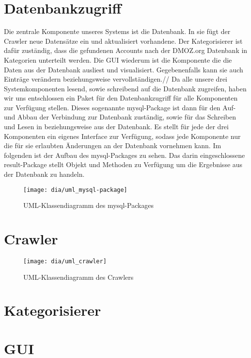
\section{Datenbankzugriff}
Die zentrale Komponente unseres Systems ist die Datenbank. In sie fügt der Crawler neue Datensätze ein und aktualisiert vorhandene. Der Kategorisierer ist dafür zuständig, dass die gefundenen Accounts nach der DMOZ.org Datenbank in Kategorien unterteilt werden. Die GUI wiederum ist die Komponente die die Daten aus der Datenbank ausliest und visualisiert. Gegebenenfalls kann sie auch Einträge verändern beziehungsweise vervollständigen.//
Da alle unsere drei Systemkomponenten lesend, sowie schreibend auf die Datenbank zugreifen, haben wir uns entschlossen ein Paket für den Datenbankzugriff für alle Komponenten zur Verfügung stellen. Dieses sogenannte mysql-Package ist dann für den Auf- und Abbau der Verbindung zur Datenbank zuständig, sowie für das Schreiben und Lesen in beziehungsweise aus der Datenbank. Es stellt für jede der drei Komponenten ein eigenes Interface zur Verfügung, sodass jede Komponente nur die für sie erlaubten Änderungen an der Datenbank vornehmen kann.
Im folgenden ist der Aufbau des mysql-Packages zu sehen. Das darin eingeschlossene result-Package stellt Objekt und Methoden zu Verfügung um die Ergebnisse aus der Datenbank zu handeln.

\begin{figure}[p]
\texttt{[image: dia/uml\_mysql-package]}
\caption{UML-Klassendiagramm des mysql-Packages}
\end{figure}

\section{Crawler}

\begin{figure}[p]
\texttt{[image: dia/uml\_crawler]}
\caption{UML-Klassendiagramm des Crawlers}
\end{figure}

\section{Kategorisierer}

\section{GUI}

